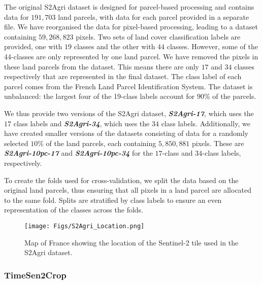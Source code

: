 \documentclass[twoside,11pt,preprint]{article}
\begin{document}
The original S2Agri dataset is designed for parcel-based processing and contains data for $191{,}703$ land parcels, with data for each parcel provided in a separate file. We have reorganised the data for pixel-based processing, leading to a dataset containing $59{,}268{,}823$ pixels. Two sets of land cover classification labels are provided, one with $19$ classes and the other with $44$ classes. However, some of the 44-classes are only represented by one land parcel. We have removed the pixels in these land parcels from the dataset. This means there are only $17$ and $34$ classes respectively that are represented in the final dataset. The class label of each parcel comes from the French Land Parcel Identification System. The dataset is unbalanced: the largest four of the 19-class labels account for $90\%$ of the parcels.

We thus provide two versions of the S2Agri dataset, \textbf{\textit{S2Agri-17}}, which uses the $17$ class labels and \textbf{\textit{S2Agri-34}}, which uses the $34$ class labels. Additionally, we have created smaller versions of the datasets consisting of data for a randomly selected $10\%$ of the land parcels, each containing $5{,}850{,}881$ pixels. These are \textbf{\textit{S2Agri-10pc-17}} and \textbf{\textit{S2Agri-10pc-34}} for the $17$-class and $34$-class labels, respectively.

To create the folds used for cross-validation, we split the data based on the original land parcels, thus ensuring that all pixels in a land parcel are allocated to the same fold. Splits are stratified by class labels to ensure an even representation of the classes across the folds.

\begin{figure}
\centering
     \texttt{[image: Figs/S2Agri\_Location.png]}
     \caption{Map of France showing the location of the Sentinel-2 tile used in the S2Agri dataset.}
     \label{fig:S2agri}
\end{figure}

\subsubsection{TimeSen2Crop}
\end{document}
